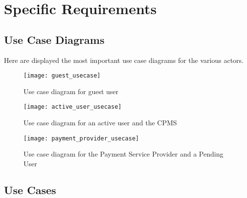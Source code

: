 \newcommand{\usecase}[5]{{
	\setlength\extrarowheight{5pt}
	\begin{tabular}{|p{3cm}|p{10cm}|}
		\hline
		Actor & #1\\
		\hline
		Entry conditions & #2\\
		\hline
		Event flow & #3\\
		\hline
		Exit condition & #4\\
		\hline
		Exceptions & #5\\
		\hline
	\end{tabular}
}}

\chapter{Specific Requirements}

\section{Use Case Diagrams}
Here are displayed the most important use case diagrams for the various actors.

\begin{figure}[h]
\centering
\texttt{[image: guest\_usecase]}
\caption{Use case diagram for guest user}
\end{figure}


\begin{figure}[h]
\centering
\texttt{[image: active\_user\_usecase]}
\caption{Use case diagram for an active user and the CPMS}
\end{figure}


\begin{figure}[h]
\centering
\texttt{[image: payment\_provider\_usecase]}
\caption{Use case diagram for the Payment Service Provider and a Pending User}
\end{figure}

\clearpage


\section{Use Cases}


